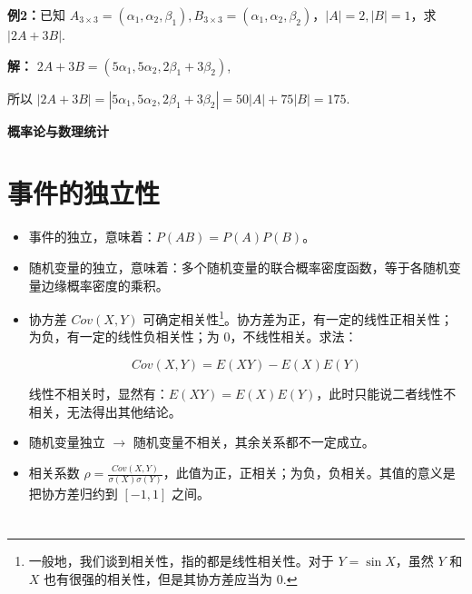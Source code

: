 \documentclass[b5paper]{ctexart}
\newcommand {\al}{\alpha}
\newcommand {\be}{\beta}
\begin{document}
	\vspace{12pt}
	
	\textbf{例2：}已知 $A_{3 \times 3} = (\al_1, \al_2, \be_1), B_{3 \times 3} = (\alpha_1, \alpha_2, \be_2)$，$|A| = 2, |B| = 1$，求 $|2A + 3B|$.
	
	\textbf{解：} $2A + 3B = (5\al_1, 5\al_2, 2\be_1 + 3\be_2)$,
	
	所以 $|2A + 3B| = |5\al_1, 5\al_2, 2\be_1 + 3\be_2| = 50|A| + 75|B| = 175$.
	
	
	\newpage
	\thispagestyle{empty}
	\begin{center}
		\parbox[c][\textheight][c]{1cm}{\centering\fontsize{40}{36}\selectfont\textbf{概率论与数理统计}}
	\end{center}
	
	\newpage
	
	\section{事件的独立性}
	
	\begin{itemize}
		\item 事件的独立，意味着：$P(AB) = P(A)P(B)$。
		
		\item 随机变量的独立，意味着：多个随机变量的联合概率密度函数，等于各随机变量边缘概率密度的乘积。
		
		\item 协方差 $Cov(X, Y)$ 可确定相关性\footnote{一般地，我们谈到相关性，指的都是线性相关性。对于 $Y = \sin X$，虽然 $Y$ 和 $X$ 也有很强的相关性，但是其协方差应当为 $0$.}。协方差为正，有一定的线性正相关性；为负，有一定的线性负相关性；为 0，不线性相关。求法：
		
		\begin{equation*}
			Cov(X, Y) = E(XY) - E(X)E(Y)
		\end{equation*}
		
		线性不相关时，显然有：$E(XY) = E(X)E(Y)$，此时只能说二者线性不相关，无法得出其他结论。
		
		\item 随机变量独立 $\rightarrow$ 随机变量不相关，其余关系都不一定成立。
		
		\item 相关系数 $\rho = \frac{Cov(X, Y)}{\sigma(X) \sigma(Y)}$，此值为正，正相关；为负，负相关。其值的意义是把协方差归约到 $[-1, 1]$ 之间。
	\end{itemize}
	
	
	
	\newpage
	\section{}
	
\end{document}
